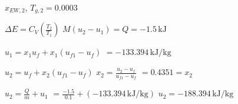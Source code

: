 \( x_{EW,2} \), \( T_{g,2} = 0.0003 \)  

\( \Delta E = C_V \left( \frac{T_2}{T_1} \right) \)  
\( M (u_2 - u_1) = Q = -1.5 \, \text{kJ} \)  

\( u_1 = x_{1} u_f + x_{1} (u_{f1} - u_{f}) \)  
\( = -133.394 \, \text{kJ/kg} \)  

\( u_2 = u_f + x_{2} (u_{f1} - u_{f}) \)  
\( x_{2} = \frac{u_2 - u_f}{u_{f1} - u_f} \)  
\( = 0.4351 = x_{2} \)  

\( u_2 = \frac{Q}{m} + u_1 \)  
\( = \frac{-1.5}{0.1} + (-133.394 \, \text{kJ/kg}) \)  
\( u_2 = -188.394 \, \text{kJ/kg} \)